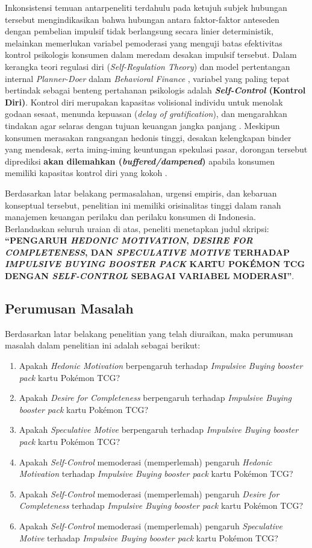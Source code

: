 \documentclass[12pt,a4paper]{article}
\numberwithin{equation}{section}
\numberwithin{table}{section}
\numberwithin{figure}{section}
\newcommand{\judulskripsi}{PENGARUH \emph{HEDONIC MOTIVATION}, \emph{DESIRE FOR COMPLETENESS}, DAN \emph{SPECULATIVE MOTIVE} TERHADAP \emph{IMPULSIVE BUYING} \emph{BOOSTER PACK} KARTU POK\'EMON TCG DENGAN \emph{SELF-CONTROL} SEBAGAI VARIABEL MODERASI}
\begin{document}
Inkonsistensi temuan antarpeneliti terdahulu pada ketujuh subjek hubungan tersebut mengindikasikan bahwa hubungan antara faktor-faktor anteseden dengan pembelian impulsif tidak berlangsung secara linier deterministik, melainkan memerlukan variabel pemoderasi yang menguji batas efektivitas kontrol psikologis konsumen dalam meredam desakan impulsif tersebut. Dalam kerangka teori regulasi diri (\emph{Self-Regulation Theory}) \citep{baumeister2002yield, vohs2007spent} dan model pertentangan internal \emph{Planner-Doer} dalam \emph{Behavioral Finance} \citep{thaler1981economic}, variabel yang paling tepat bertindak sebagai benteng pertahanan psikologis adalah \textbf{\emph{Self-Control} (Kontrol Diri)}. Kontrol diri merupakan kapasitas volisional individu untuk menolak godaan sesaat, menunda kepuasan (\emph{delay of gratification}), dan mengarahkan tindakan agar selaras dengan tujuan keuangan jangka panjang \citep{tangney2004high, sultan2012building}. Meskipun konsumen merasakan rangsangan hedonis tinggi, desakan kelengkapan binder yang mendesak, serta iming-iming keuntungan spekulasi pasar, dorongan tersebut diprediksi \textbf{akan dilemahkan (\emph{buffered/dampened})} apabila konsumen memiliki kapasitas kontrol diri yang kokoh \citep{lienardy2026role}.

Berdasarkan latar belakang permasalahan, urgensi empiris, dan kebaruan konseptual tersebut, penelitian ini memiliki orisinalitas tinggi dalam ranah manajemen keuangan perilaku dan perilaku konsumen di Indonesia. Berlandaskan seluruh uraian di atas, peneliti menetapkan judul skripsi: \textbf{``\judulskripsi''}.

\subsection{Perumusan Masalah}

Berdasarkan latar belakang penelitian yang telah diuraikan, maka perumusan masalah dalam penelitian ini adalah sebagai berikut:
\begin{enumerate}
  \item Apakah \emph{Hedonic Motivation} berpengaruh terhadap \emph{Impulsive Buying} \emph{booster pack} kartu Pok\'emon TCG?
  \item Apakah \emph{Desire for Completeness} berpengaruh terhadap \emph{Impulsive Buying} \emph{booster pack} kartu Pok\'emon TCG?
  \item Apakah \emph{Speculative Motive} berpengaruh terhadap \emph{Impulsive Buying} \emph{booster pack} kartu Pok\'emon TCG?
  \item Apakah \emph{Self-Control} memoderasi (memperlemah) pengaruh \emph{Hedonic Motivation} terhadap \emph{Impulsive Buying} \emph{booster pack} kartu Pok\'emon TCG?
  \item Apakah \emph{Self-Control} memoderasi (memperlemah) pengaruh \emph{Desire for Completeness} terhadap \emph{Impulsive Buying} \emph{booster pack} kartu Pok\'emon TCG?
  \item Apakah \emph{Self-Control} memoderasi (memperlemah) pengaruh \emph{Speculative Motive} terhadap \emph{Impulsive Buying} \emph{booster pack} kartu Pok\'emon TCG?
\end{enumerate}
\end{document}

